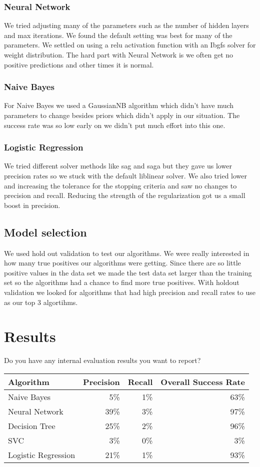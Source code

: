 \documentclass[11pt,a4paper]{article}
\begin{document}
		\subsubsection{Neural Network}
			We tried adjusting many of the parameters such as the number of hidden layers and max iterations.
			We found the default setting was best for many of the parameters.
			We settled on using a relu activation function with an Ibgfs solver for weight distribution.
			The hard part with Neural Network is we often get no positive predictions and other times it is normal.

		\subsubsection{Naive Bayes}
			For Naive Bayes we used a GaussianNB algorithm which didn't have much parameters to change besides priors which didn't apply in our situation.
			The success rate was so low early on we didn't put much effort into this one.

		\subsubsection{Logistic Regression}
			We tried different solver methods like sag and saga but they gave us lower precision rates so we stuck with the default liblinear solver.
			We also tried lower and increasing the tolerance for the stopping criteria and saw no changes to precision and recall.
			Reducing the strength of the regularization got us a small boost in precision.

	\subsection{Model selection}
		We used hold out validation to test our algorithms.
		We were really interested in how many true positives our algorithms were getting.
		Since there are so little positive values in the data set we made the test data set larger than the training set so the algorithms had a chance to find more true positives.
		With holdout validation we looked for algorithms that had high precision and recall rates to use as our top 3 algortihms.

\section{Results}
	Do you have any internal evaluation results you want to report?

	\begin{tabular}{ | l | r | r | r | }
		\hline
		Algorithm & Precision & Recall & Overall Success Rate \\
		\hline
		Naive Bayes & 5\% & 1\% & 63\% \\
		\hline
		Neural Network & 39\% & 3\% & 97\% \\
		\hline
		Decision Tree & 25\% & 2\% & 96\% \\
		\hline
		SVC & 3\% & 0\% & 3\% \\
		\hline
		Logistic Regression & 21\% & 1\% & 93\% \\
		\hline
	\end{tabular}
\end{document}
